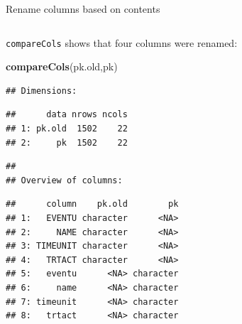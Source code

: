 \documentclass[
  8pt,
  ignorenonframetext,
  aspectratio=169]{beamer}
\newenvironment{Shaded}{\begin{snugshade}}{\end{snugshade}}
\newcommand{\KeywordTok}[1]{\textcolor[rgb]{0.13,0.29,0.53}{\textbf{#1}}}
\newcommand{\NormalTok}[1]{#1}
\begin{document}
\begin{frame}[fragile]{Rename columns based on contents}
\begin{columns}[T]
\begin{column}{0.48\textwidth}
\texttt{compareCols} shows that four columns were renamed:

\begin{Shaded}
\begin{Highlighting}[]
\KeywordTok{compareCols}\NormalTok{(pk.old,pk)}
\end{Highlighting}
\end{Shaded}

\begin{verbatim}
## Dimensions:
\end{verbatim}

\begin{verbatim}
##      data nrows ncols
## 1: pk.old  1502    22
## 2:     pk  1502    22
\end{verbatim}

\begin{verbatim}
## 
## Overview of columns:
\end{verbatim}

\begin{verbatim}
##      column    pk.old        pk
## 1:   EVENTU character      <NA>
## 2:     NAME character      <NA>
## 3: TIMEUNIT character      <NA>
## 4:   TRTACT character      <NA>
## 5:   eventu      <NA> character
## 6:     name      <NA> character
## 7: timeunit      <NA> character
## 8:   trtact      <NA> character
\end{verbatim}

\normalsize
\end{column}
\end{columns}
\end{frame}
\end{document}
